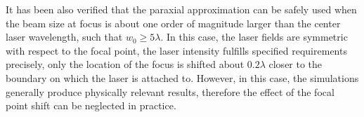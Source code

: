 It has been also verified that the paraxial approximation can be safely used when the beam size at focus is about one order of magnitude larger than the center laser wavelength, such that $ w_0 \geq 5 \lambda $. In this case, the laser fields are symmetric with respect to the focal point, the laser intensity fulfills specified requirements precisely, only the location of the focus is shifted about $ 0.2 \lambda $ closer to the boundary on which the laser is attached to. However, in this case, the simulations generally produce physically relevant results, therefore the effect of the focal point shift can be neglected in practice.
